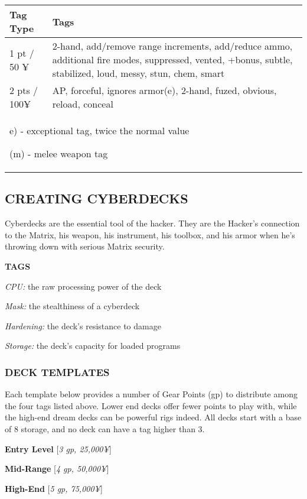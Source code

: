 \documentclass[oneside,10pt]{article}
\begin{document}
\begin{multicols}{2}
\begin{center}
\begin{tabular}{lp{5.5cm}}
\toprule
Tag Type& Tags\\
\midrule
1 pt / 50 ¥ & 2-hand, add/remove range increments, add/reduce ammo, additional fire modes, suppressed, vented, +bonus, subtle, stabilized, loud, messy, stun, chem, smart\\
2 pts / 100¥ & AP, forceful, ignores armor(e), 2-hand, fuzed, obvious, reload, conceal\\
\multicolumn{2}{p{5.5cm}}{e) - exceptional tag, twice the normal value

(m) - melee weapon tag
}\\
\bottomrule
\end{tabular}
\end{center}


\subsection{CREATING CYBERDECKS}
Cyberdecks are the essential tool of the hacker. They are the
Hacker’s connection to the Matrix, his weapon, his instrument, his toolbox, and his armor when he’s throwing down
with serious Matrix security.

\textbf{TAGS
}
\begin{dent}

\textit{CPU:} the raw processing power of the deck

\textit{Mask:} the stealthiness of a cyberdeck

\textit{Hardening:} the deck’s resistance to damage

\textit{Storage:} the deck’s capacity for loaded programs
\end{dent}

\subsubsection{DECK TEMPLATES}
Each template below provides a number of Gear Points (gp)
to distribute among the four tags listed above. Lower end
decks offer fewer points to play with, while the high-end
dream decks can be powerful rigs indeed. All decks start with
a base of 8 storage, and no deck can have a tag higher than 3.

\textbf{Entry Level} [\textit{3 gp, 25,000¥}]

\textbf{Mid-Range} [\textit{4 gp, 50,000¥}]

\textbf{High-End} [\textit{5 gp, 75,000¥}]


\end{multicols}
\end{document}
